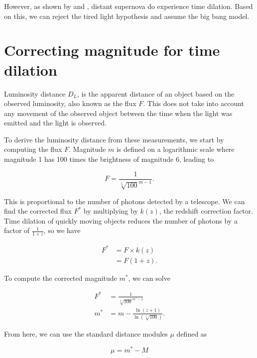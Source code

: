 \documentclass{article}
\begin{document}
However, as shown by \citet{blondin2008} and \citet{white2024}, distant
supernova do experience time dilation. Based on this, we can reject the tired
light hypothesis and assume the big bang model.

\section{Correcting magnitude for time dilation}
\label{sec:correction}

Luminosity distance $D_L$, is the apparent distance of an object based on the
observed luminosity, also known as the flux $F$. This does not take into
account any movement of the observed object between the time when the light was
emitted and the light is observed.

To derive the luminosity distance from these measurements, we start
by computing the flux $F$. Magnitude $m$ is defined on a logarithmic scale
where magnitude 1 has 100 times the brightness of magnitude 6, leading to

\begin{equation}
  F = \frac{1}{\sqrt[5]{100}^{m - 1}}.
\end{equation}

This is proportional to the number of photons detected by a telescope. We can
find the corrected flux $F^*$ by multiplying by $k(z)$, the redshift correction
factor. Time dilation of quickly moving objects reduces the number of photons
by a factor of $\frac{1}{1 + z}$, so we have

\begin{equation}
\begin{aligned}
  F^* &= F \times k(z) \\
      &= F (1 + z).
\end{aligned}
\end{equation}

To compute the corrected magnitude $m^*$, we can solve

\begin{equation}
\begin{aligned}
   F^* &= \frac{1}{\sqrt[5]{100}^{m^* - 1}} \\
   m^* &= m - \frac{\ln{(z + 1)}}{\ln{(\sqrt[5]{100})}}.
\end{aligned}
\end{equation}

From here, we can use the standard distance modules $\mu$ defined as

\begin{equation}
  \mu = m^* - M
\end{equation}
\end{document}
